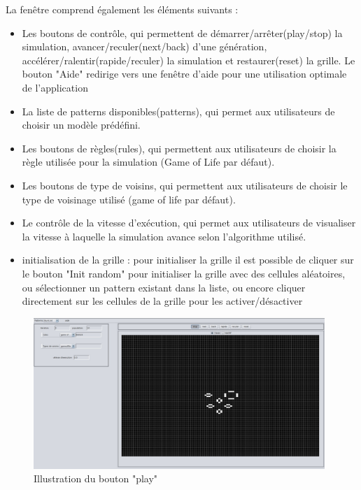 La fenêtre comprend également les éléments suivants :

\begin{itemize}
\item Les boutons de contrôle, qui permettent de démarrer/arrêter(play/stop) la simulation, avancer/reculer(next/back) d'une génération, accélérer/ralentir(rapide/reculer) la simulation et restaurer(reset) la grille. Le bouton "Aide" redirige vers une fenêtre d'aide pour une utilisation optimale de l'application
\item La liste de patterns disponibles(patterns), qui permet aux utilisateurs de choisir un modèle prédéfini.
\item Les boutons de règles(rules), qui permettent aux utilisateurs de choisir la règle utilisée pour la simulation (Game of Life par défaut).
\item Les boutons de type de voisins, qui permettent aux utilisateurs de choisir le type de voisinage utilisé (game of life par défaut).
\item Le contrôle de la vitesse d'exécution, qui permet aux utilisateurs de visualiser la vitesse à laquelle la simulation avance selon l'algorithme utilisé.
\item initialisation de la grille : pour initialiser la grille il est possible de  cliquer sur le bouton "Init random" pour initialiser la grille avec des cellules aléatoires, ou sélectionner un pattern existant dans la liste,
ou encore cliquer directement sur les cellules de la grille pour les activer/désactiver
\end{itemize}
\newpage
\begin{figure}[h]
\centering
\includegraphics[width=11cm]{images/image2.jpeg}
\caption{Illustration du bouton "play"}
\end{figure}

